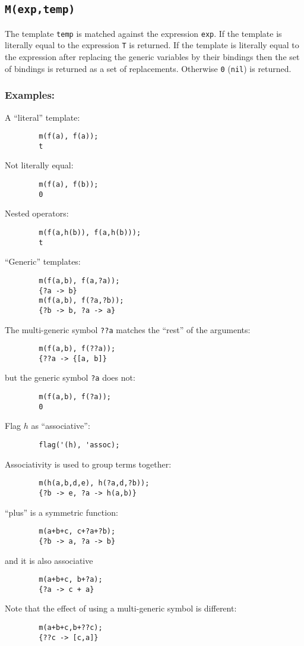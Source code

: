 \subsection{\texttt{M(exp,temp)}}

The template \texttt{temp} is matched against the expression \texttt{exp}.  If
the template is literally equal to the expression \texttt{T} is returned.  If
the template is literally equal to the expression after replacing the generic
variables by their bindings then the set of bindings is returned as a set of
replacements.  Otherwise \texttt{0} (\texttt{nil}) is returned.

\subsubsection*{Examples:}

A ``literal'' template:
\begin{verbatim}
        m(f(a), f(a));
        t
\end{verbatim}
Not literally equal:
\begin{verbatim}
        m(f(a), f(b));
        0
\end{verbatim}
Nested operators:
\begin{verbatim}
        m(f(a,h(b)), f(a,h(b)));
        t
\end{verbatim}
``Generic'' templates:
\begin{verbatim}
        m(f(a,b), f(a,?a));
        {?a -> b}
        m(f(a,b), f(?a,?b));
        {?b -> b, ?a -> a}
\end{verbatim}
The multi-generic symbol \texttt{??a} matches the ``rest'' of the arguments:
\begin{verbatim}
        m(f(a,b), f(??a));
        {??a -> {[a, b]}
\end{verbatim}
but the generic symbol \texttt{?a} does not:
\begin{verbatim}
        m(f(a,b), f(?a));
        0
\end{verbatim}
Flag $h$ as ``associative'':
\begin{verbatim}
        flag('(h), 'assoc);
\end{verbatim}
Associativity is used to group terms together:
\begin{verbatim}
        m(h(a,b,d,e), h(?a,d,?b));
        {?b -> e, ?a -> h(a,b)}
\end{verbatim}
``plus'' is a symmetric function:
\begin{verbatim}
        m(a+b+c, c+?a+?b);
        {?b -> a, ?a -> b}
\end{verbatim}
and it is also associative
\begin{verbatim}
        m(a+b+c, b+?a);
        {?a -> c + a}
\end{verbatim}
Note that the effect of using a multi-generic symbol is different:
\begin{verbatim}
        m(a+b+c,b+??c);
        {??c -> [c,a]}
\end{verbatim}



